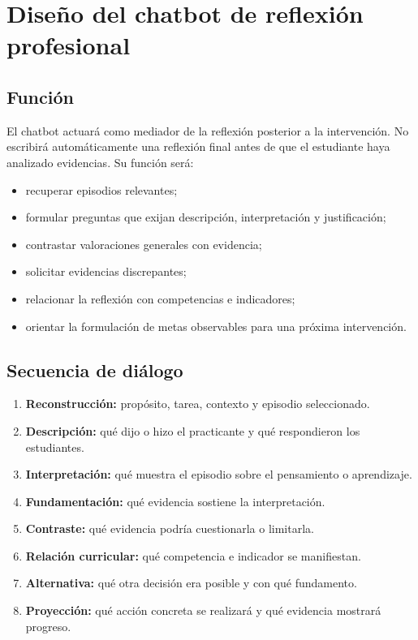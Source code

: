 \documentclass[11pt,a4paper]{article}
\begin{document}
\section{Diseño del chatbot de reflexión profesional}

\subsection{Función}

El chatbot actuará como mediador de la reflexión posterior a la intervención. No escribirá automáticamente una reflexión final antes de que el estudiante haya analizado evidencias. Su función será:

\begin{itemize}
    \item recuperar episodios relevantes;
    \item formular preguntas que exijan descripción, interpretación y justificación;
    \item contrastar valoraciones generales con evidencia;
    \item solicitar evidencias discrepantes;
    \item relacionar la reflexión con competencias e indicadores;
    \item orientar la formulación de metas observables para una próxima intervención.
\end{itemize}

\subsection{Secuencia de diálogo}

\begin{enumerate}
    \item \textbf{Reconstrucción:} propósito, tarea, contexto y episodio seleccionado.
    \item \textbf{Descripción:} qué dijo o hizo el practicante y qué respondieron los estudiantes.
    \item \textbf{Interpretación:} qué muestra el episodio sobre el pensamiento o aprendizaje.
    \item \textbf{Fundamentación:} qué evidencia sostiene la interpretación.
    \item \textbf{Contraste:} qué evidencia podría cuestionarla o limitarla.
    \item \textbf{Relación curricular:} qué competencia e indicador se manifiestan.
    \item \textbf{Alternativa:} qué otra decisión era posible y con qué fundamento.
    \item \textbf{Proyección:} qué acción concreta se realizará y qué evidencia mostrará progreso.
\end{enumerate}
\end{document}

